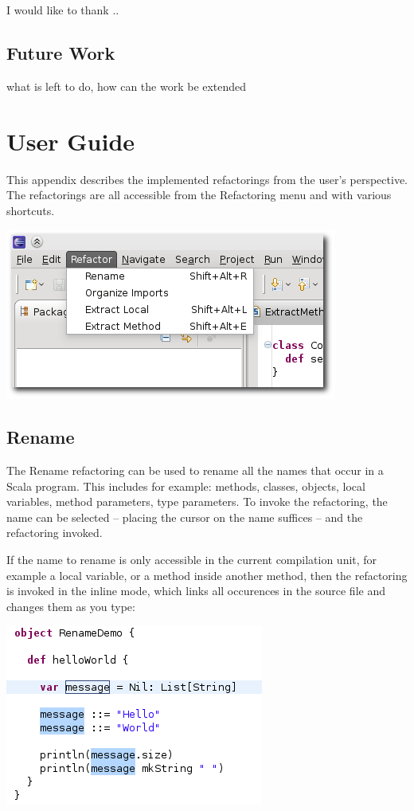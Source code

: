 \documentclass[10pt,a4paper,oneside]{scrreprt}
\begin{document}
I would like to thank ..

\section{Future Work}

what is left to do, how can the work be extended

\appendix

\chapter{User Guide} \label{chapter:user-guide}

This appendix describes the implemented refactorings from the user's perspective. The refactorings are all accessible from the Refactoring menu and with various shortcuts.

\begin{center}
  \includegraphics[width=0.6\linewidth]{refactoring-menu-screenshot.png}
\end{center}

\section{Rename}

The Rename refactoring can be used to rename all the names that occur in a Scala program. This includes for example: methods, classes, objects, local variables, method parameters, type parameters. To invoke the refactoring, the name can be selected -- placing the cursor on the name suffices -- and the refactoring invoked. 

If the name to rename is only accessible in the current compilation unit, for example a local variable, or a method inside another method, then the refactoring is invoked in the inline mode, which links all occurences in the source file and changes them as you type:

\begin{center}
  \includegraphics[width=0.5\linewidth]{rename_screenshot_3.png}
\end{center}
\end{document}
